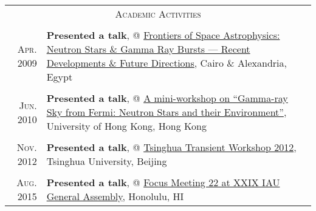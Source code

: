 \documentclass[10pt]{article}
\begin{document}
\begin{longtable}{r|p{16.5cm}}

    \multicolumn{2}{c}{\textsc{Academic Activities}}  \\
    \multicolumn{2}{c}{} \\

    \textsc{Apr. 2009}   &   \textbf{Presented a talk}, @ \href{http://www.ns-grb.com/index0.html}{Frontiers of Space Astrophysics: Neutron Stars \& Gamma Ray Bursts --- Recent Developments \& Future Directions}, Cairo \& Alexandria, Egypt     \\
    \multicolumn{2}{c}{} \\

    \textsc{Jun. 2010}   &   \textbf{Presented a talk}, @ \href{http://www.physics.hku.hk/~astro/2010Astro/Index.htm}{A mini-workshop on ``Gamma-ray Sky from Fermi: Neutron Stars and their Environment''}, University of Hong Kong, Hong Kong   \\
    \multicolumn{2}{c}{} \\

    \textsc{Nov. 2012}   &   \textbf{Presented a talk}, @ \href{http://www.thca.tsinghua.edu.cn/en/index.php/Workshop_programme}{Tsinghua Transient Workshop 2012}, Tsinghua University, Beijing   \\
    \multicolumn{2}{c}{} \\

    \textsc{Aug. 2015}   &   \textbf{Presented a talk}, @ \href{http://astronomy2015.org/node/80}{Focus Meeting 22 at XXIX IAU
General Assembly}, Honolulu, HI     \\

\end{longtable}
\end{document}
